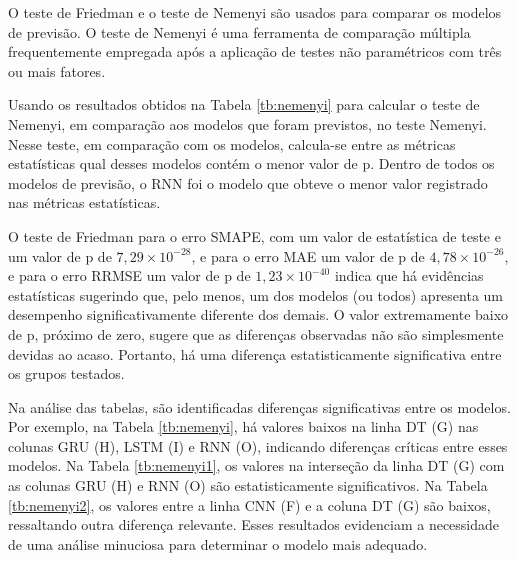 O teste de Friedman e o teste de Nemenyi são usados para comparar os modelos de previsão. O teste de Nemenyi é uma ferramenta de comparação múltipla frequentemente empregada após a aplicação de testes não paramétricos com três ou mais fatores.

Usando os resultados obtidos na Tabela \ref{tb:nemenyi} para calcular o teste de Nemenyi, em comparação aos modelos que foram previstos, no teste Nemenyi. Nesse teste, em comparação com os modelos, calcula-se entre as métricas estatísticas qual desses modelos contém o menor valor de p. Dentro de todos os modelos de previsão, o RNN foi o modelo que obteve o menor valor registrado nas métricas estatísticas.

O teste de Friedman para o erro SMAPE, com um valor de estatística de teste e um valor de p de $7,29 \times 10^{-28}$, e para o erro MAE um valor de p de $4,78 \times 10^{-26}$, e para o erro RRMSE um valor de p de $1,23 \times 10^{-40}$ indica que há evidências estatísticas sugerindo que, pelo menos, um dos modelos (ou todos) apresenta um desempenho significativamente diferente dos demais. O valor extremamente baixo de p, próximo de zero, sugere que as diferenças observadas não são simplesmente devidas ao acaso. Portanto, há uma diferença estatisticamente significativa entre os grupos testados.


Na análise das tabelas, são identificadas diferenças significativas entre os modelos. Por exemplo, na Tabela \ref{tb:nemenyi}, há valores baixos na linha DT (G) nas colunas GRU (H), LSTM (I) e RNN (O), indicando diferenças críticas entre esses modelos. Na Tabela \ref{tb:nemenyi1}, os valores na interseção da linha DT (G) com as colunas GRU (H) e RNN (O) são estatisticamente significativos. Na Tabela \ref{tb:nemenyi2}, os valores entre a linha CNN (F) e a coluna DT (G) são baixos, ressaltando outra diferença relevante. Esses resultados evidenciam a necessidade de uma análise minuciosa para determinar o modelo mais adequado.

